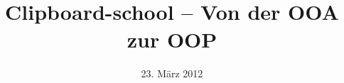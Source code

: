 \documentclass[a4paper,11pt,titlepage]{article}
\title{Clipboard-school – Von der OOA zur OOP}
\author{} %
\date{23. März 2012}
\begin{document}
\maketitle

\begin{abstract} %
\end{abstract}

\tableofcontents
\thispagestyle{empty}
\newpage
\setcounter{page}{1}
\end{document}
